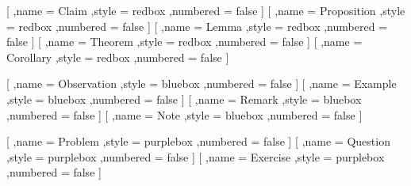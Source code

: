 {        %
        [
            ,name = Claim
            ,style = redbox
            ,numbered = false
        ]
        [
            ,name = Proposition
            ,style = redbox
            ,numbered = false
        ]
        [
            ,name = Lemma
            ,style = redbox
            ,numbered = false
        ]
        [
            ,name = Theorem
            ,style = redbox
            ,numbered = false
        ]
        [
            ,name = Corollary
            ,style = redbox
            ,numbered = false
        ]

        [
            ,name = Observation
            ,style = bluebox
            ,numbered = false
        ]
        [
            ,name = Example
            ,style = bluebox
            ,numbered = false
        ]
        [
            ,name = Remark
            ,style = bluebox
            ,numbered = false
        ]
        [
            ,name = Note
            ,style = bluebox
            ,numbered = false
        ]

        [
            ,name = Problem
            ,style = purplebox
            ,numbered = false
        ]
        [
            ,name = Question
            ,style = purplebox
            ,numbered = false
        ]
        [
            ,name = Exercise
            ,style = purplebox
            ,numbered = false
        ]


}
